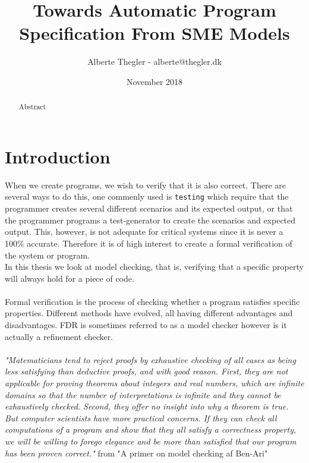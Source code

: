 \documentclass[a4paper]{report}
\title{Towards Automatic Program Specification From SME Models}
\author{Alberte Thegler - alberte@thegler.dk}
\date{November 2018}
\begin{document}
\maketitle

\begin{abstract}
\begin{doublespace}
Abstract

\end{doublespace}
\end{abstract}



\newpage
\tableofcontents
%
%
\newpage
{}
\chapter{Introduction}
When we create programs, we wish to verify that it is also correct. There are several ways to do this, one commenly used is \texttt{testing} which require that the programmer creates several different scenarios and its expected output, or that the programmer programs a test-generator to create the scenarios and expected output. This, however, is not adequate for critical systems since it is never a 100\% accurate. Therefore it is of high interest to create a formal verification of the system or program.\\


In this thesis we look at model checking, that is, verifying that a specific property will always hold for a piece of code.
\\\\

Formal verification is the process of checking whether a program satisfies specific properties. Different methods have evolved, all having different advantages and disadvantages. FDR is sometimes referred to as a model checker however is it actually a refinement checker.
\\\\


\textit{"Matematicians tend to reject proofs by exhaustive checking of all cases as being less satisfying than deductive proofs, and with good reason. First, they are not applicable for proving theorems about integers and real numbers, which are infinite domains so that the number of interpretations is infinite and they cannot be exhaustively checked. Second, they offer no insight into why a theorem is true. But computer scientists have more practical concerns. If they can check all computations of a program and show that they all satisfy a correctness property, we will be willing to forego elegance and be more than satisfied that our program has been proven correct."} from "A primer on model checking af Ben-Ari" \cite{Ben-ari2010}\
\newpage
\end{document}
